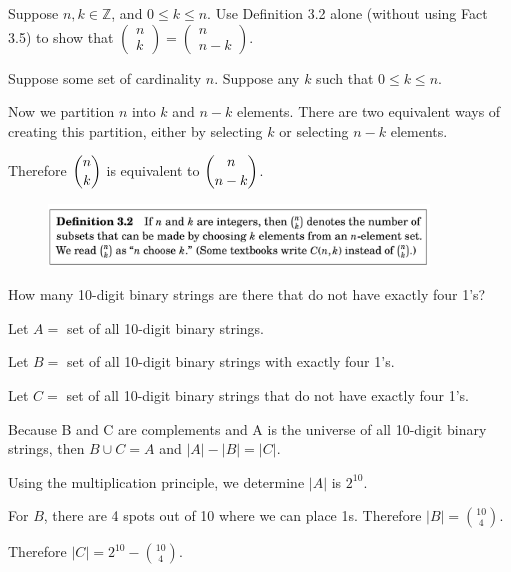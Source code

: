 \documentclass[openany, 11pt]{book}
\begin{document}
\begin{exercise}{}{}
	Suppose $n, k \in \mathbb{Z}$, and $0 \leq k \leq n$. Use Definition 3.2
	alone (without using Fact 3.5) to show that $\left(\begin{array}{l}n \\
				k\end{array}\right)=\left(\begin{array}{c}n \\ n-k\end{array}\right)$.
	\begin{alist}
		\item Suppose some set of cardinality $n$.  Suppose any $k$ such that $0 \leq k \leq n$.
		\item Now we partition $n$ into $k$ and $n-k$ elements. There are two
		equivalent ways of creating this partition, either by selecting $k$ or
		selecting $n-k$ elements.
		\item Therefore $\dbinom{n}{k}$ is equivalent to $\dbinom{n}{n-k}$.
	\end{alist}
\end{exercise}

\begin{figure}
	\centering
	\includegraphics[width=0.9\textwidth]{images/definition03_02.png}
	\label{fig:mypicture}
\end{figure}

\begin{exercise}{}{}
	How many 10-digit binary strings are there that do not have exactly four
	1's?
	\begin{alist}
		\item Let $A=$ set of all 10-digit binary strings.
		\item Let $B=$ set of all 10-digit binary strings with exactly four 1's.
		\item Let $C=$ set of all 10-digit binary strings that do not have exactly
		four 1's.
		\item Because B and C are complements and A is the universe of all 10-digit
		binary strings, then $B \cup C = A$ and $|A|-|B| = |C|$.
		\item Using the multiplication principle, we determine $|A|$ is $2^{10}$.
		\item For $B$, there are 4 spots out of 10 where we can place 1s. Therefore
		\mbox{$|B|=\binom{10}{4}$}.
		\item Therefore $|C|=2^{10} - \binom{10}{4}$.
	\end{alist}
\end{exercise}
\end{document}
